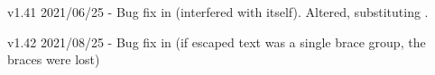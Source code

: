 v1.41 2021/06/25
      - Bug fix in \tcpopliteralappto (\@tmp interfered with itself). Altered,
        substituting \@@tmp.

v1.42 2021/08/25
      - Bug fix in \tc@escapecytoks (if escaped text was a single brace group, the
        braces were lost)

